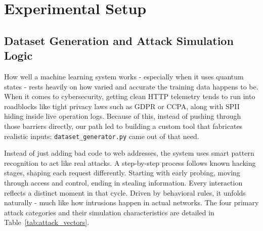 \documentclass[journal,onecolumn]{IEEEtran}
\begin{document}
\section{Experimental Setup}

\subsection{Dataset Generation and Attack Simulation Logic}

How well a machine learning system works - especially when it uses quantum states - rests heavily on how varied and accurate the training data happens to be. When it comes to cybersecurity, getting clean HTTP telemetry tends to run into roadblocks like tight privacy laws such as GDPR or CCPA, along with SPII hiding inside live operation logs. Because of this, instead of pushing through those barriers directly, our path led to building a custom tool that fabricates realistic inputs: \texttt{dataset\_generator.py} came out of that need.

Instead of just adding bad code to web addresses, the system uses smart pattern recognition to act like real attacks. A step-by-step process follows known hacking stages, shaping each request differently. Starting with early probing, moving through access and control, ending in stealing information. Every interaction reflects a distinct moment in that cycle. Driven by behavioral rules, it unfolds naturally - much like how intrusions happen in actual networks. The four primary attack categories and their simulation characteristics are detailed in Table~\ref{tab:attack_vectors}.

\begin{table}[h]
\centering
\caption{Synthetic Attack Vector Distribution and Characteristics}
\label{tab:attack_vectors}
\footnotesize
\setlength{\tabcolsep}{3pt}
\renewcommand{\arraystretch}{1.1}

\end{table}
\end{document}
